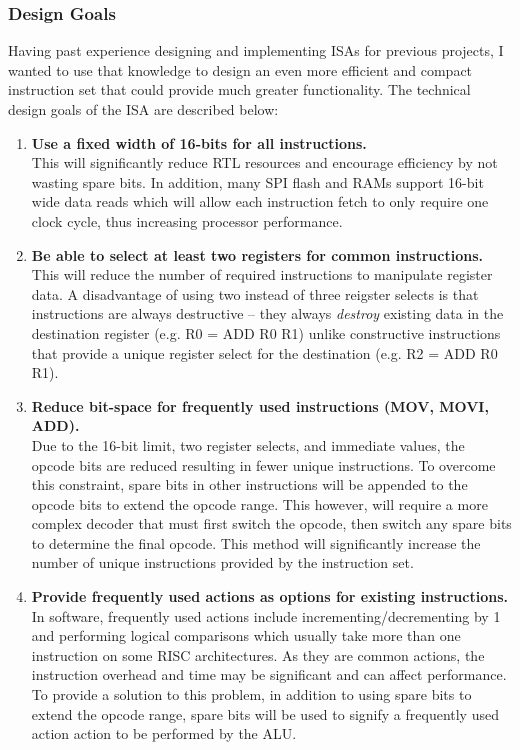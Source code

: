 \documentclass[11pt,a4paper]{report}
\begin{document}
{\subsubsection{Design Goals}
Having past experience designing and implementing ISAs for previous projects, I wanted to use that knowledge to design an even more efficient and compact instruction set that could provide much greater functionality. The technical design goals of the ISA are described below:

\begin{enumerate}[leftmargin=3\parindent, label=\bfseries ISA\arabic*, style=nextline]
\item{\textbf{Use a fixed width of 16-bits for all instructions.}\\
This will significantly reduce RTL resources and encourage efficiency by not wasting spare bits. In addition, many SPI flash and RAMs support 16-bit wide data reads which will allow each instruction fetch to only require one clock cycle, thus increasing processor performance.}\label{isa:16}

\item{\textbf{Be able to select at least two registers for common instructions.}\\
This will reduce the number of required instructions to manipulate register data. A disadvantage of using two instead of three reigster selects is that instructions are always destructive -- they always \textit{destroy} existing data in the destination register (e.g. R0 = ADD R0 R1) unlike constructive instructions that provide a unique register select for the destination (e.g. R2 = ADD R0 R1). }\label{isa:regs}

\item{\textbf{Reduce bit-space for frequently used instructions (MOV, MOVI, ADD).}\\
Due to the 16-bit limit, two register selects, and immediate values, the opcode bits are reduced resulting in fewer unique instructions. To overcome this constraint, spare bits in other instructions will be appended to the opcode bits to extend the opcode range. This however, will require a more complex decoder that must first switch the opcode, then switch any spare bits to determine the final opcode. This method will significantly increase the number of unique instructions provided by the instruction set.}\label{isa:bits}

\item{\textbf{Provide frequently used actions as options for existing instructions.}\\
In software, frequently used actions include incrementing/decrementing by 1 and performing logical comparisons which usually take more than one instruction on some RISC architectures. As they are common actions, the instruction overhead and time may be significant and can affect performance. To provide a solution to this problem, in addition to using spare bits to extend the opcode range, spare bits will be used to signify a frequently used action action to be performed by the ALU.

}
\end{enumerate}}
\end{document}
